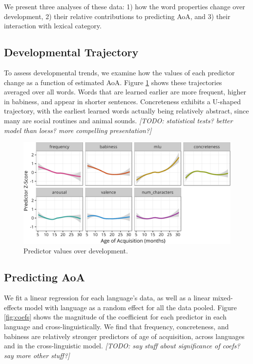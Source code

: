 \documentclass[10pt, letterpaper]{article}
\newenvironment{CodeChunk}{}{}
\begin{document}
We present three analyses of these data: 1) how the word properties
change over development, 2) their relative contributions to predicting
AoA, and 3) their interaction with lexical category.

\subsection{Developmental Trajectory}\label{developmental-trajectory}

To assess developmental trends, we examine how the values of each
predictor change as a function of estimated AoA. Figure \ref{fig:devo}
shows these trajectories averaged over all words. Words that are learned
earlier are more frequent, higher in babiness, and appear in shorter
sentences. Concreteness exhibits a U-shaped trajectory, with the
earliest learned words actually being relatively abstract, since many
are social routines and animal sounds. \emph{{[}TODO: statistical tests?
better model than loess? more compelling presentation?{]}}

\begin{CodeChunk}
\begin{figure}[tb]

{\centering \includegraphics{figs/devo-1} 

}

\caption[Predictor values over development]{Predictor values over development.}\label{fig:devo}
\end{figure}
\end{CodeChunk}

\newpage

\subsection{Predicting AoA}\label{predicting-aoa}

We fit a linear regression for each language's data, as well as a linear
mixed-effects model with language as a random effect for all the data
pooled. Figure \ref{fig:coefs} shows the magnitude of the coefficient
for each predictor in each language and cross-linguistically. We find
that frequency, concreteness, and babiness are relatively stronger
predictors of age of acquisition, across languages and in the
cross-linguistic model. \emph{{[}TODO: say stuff about significance of
coefs? say more other stuff?{]}}
\end{document}
